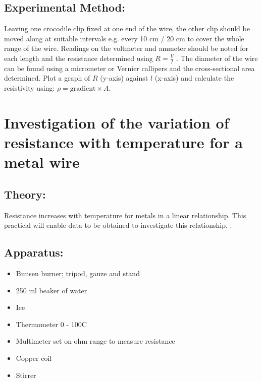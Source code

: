 \subsection{Experimental Method:}  
Leaving one crocodile clip fixed at one end of the wire, the other clip should be moved along at suitable intervals e.g. every 10 cm / 20 cm to cover the whole range of the wire. Readings on the voltmeter and ammeter should be noted for each length and the resistance determined using $R = \frac{V}{I}$ . The diameter of the wire can be found using a micrometer or Vernier callipers and the cross-sectional area determined. Plot a graph of $R$ (y-axis) against $l$ (x-axis) and calculate the resistivity using:  $\rho = \text{gradient} \times A$. 
\section{Investigation of the variation of resistance with temperature for a metal wire}
\subsection{Theory:} 
Resistance increases with temperature for metals in a linear relationship. This practical will enable data to be obtained to investigate this relationship. .
\subsection{Apparatus:}
\begin{itemize}
\item Bunsen burner; tripod, gauze and stand 
\item 250 ml beaker of water 
\item Ice 
\item Thermometer 0 - 100C 
\item Multimeter set on ohm range to measure resistance 
\item Copper coil 
\item Stirrer
\end{itemize}

